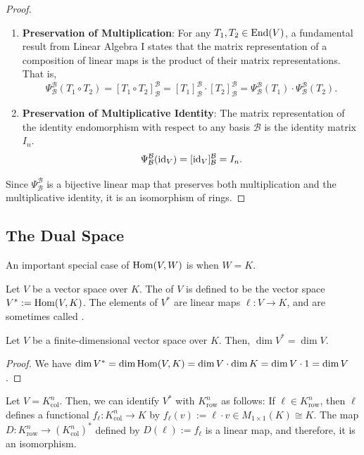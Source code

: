 \begin{proof}
  \begin{enumerate}
    \item \textbf{Preservation of Multiplication}: For any $T_1, T_2 \in \operatorname{End}(V)$, a fundamental result from Linear Algebra I states that the matrix representation of a composition of linear maps is the product of their matrix representations. That is,
    \[ \Psi_{\mathcal{B}}^{\mathcal{B}}(T_1 \circ T_2) = [T_1 \circ T_2]_{\mathcal{B}}^{\mathcal{B}} = [T_1]_{\mathcal{B}}^{\mathcal{B}} \cdot [T_2]_{\mathcal{B}}^{\mathcal{B}} = \Psi_{\mathcal{B}}^{\mathcal{B}}(T_1) \cdot \Psi_{\mathcal{B}}^{\mathcal{B}}(T_2). \]
    \item \textbf{Preservation of Multiplicative Identity}: The matrix representation of the identity endomorphism with respect to any basis $\mathcal{B}$ is the identity matrix $I_n$.
    \[ \Psi_{\mathcal{B}}^{\mathcal{B}}(\operatorname{id}_V) = [\operatorname{id}_V]_{\mathcal{B}}^{\mathcal{B}} = I_n. \]
  \end{enumerate}
  Since $\Psi_{\mathcal{B}}^{\mathcal{B}}$ is a bijective linear map that preserves both multiplication and the multiplicative identity, it is an isomorphism of rings.
\end{proof}


\subsection{The Dual Space}
An important special case of $\operatorname{Hom}(V,W)$ is when $W=K$.

\begin{definition}
  Let $V$ be a vector space over $K$. The  of $V$ is defined to be the vector space $V^* := \operatorname{Hom}(V,K)$. The elements of $V^*$ are linear maps $\ell \colon V \to K$, and are sometimes called .
\end{definition}

\begin{corollary}
  Let $V$ be a finite-di\-men\-sional vector space over $K$. Then, $\dim V^* = \dim V$.
\end{corollary}

\begin{proof}
  We have $\dim V^* = \dim \operatorname{Hom}(V,K) = \dim V \cdot \dim K = \dim V \cdot 1 = \dim V$.
\end{proof}

Let $V = K_{\text{col}}^n$. Then, we can identify $V^*$ with $K_{\text{row}}^n$ as follows: If $\ell \in K_{\text{row}}^n$, then $\ell$ defines a functional $f_{\ell} \colon K_{\text{col}}^n \to K$ by $f_{\ell}(v) := \ell \cdot v \in M_{1 \times 1}(K) \cong K$. The map $D \colon K_{\text{row}}^n \to (K_{\text{col}}^n)^*$ defined by $D(\ell) := f_{\ell}$ is a linear map, and therefore, it is an isomorphism.

